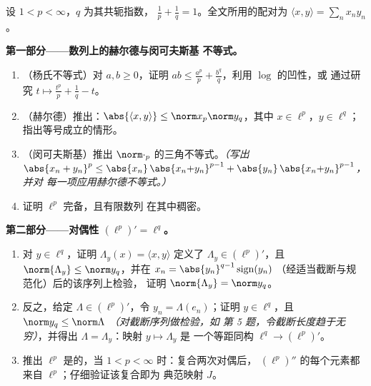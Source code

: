 \begin{problem}[{周末问题——$(\ell^p)' = \ell^q$，
自反性，以及 $\ell^\infty$ 的奇异性}]
\label{pb:b3:banach:1}
设 $1 < p < \infty$，$q$ 为其共轭指数，
$\frac1p + \frac1q = 1$。全文所用的配对为 $\langle x,
y\rangle = \sum_n x_ny_n$。

\medskip
\noindent\textbf{第一部分——数列上的赫尔德与闵可夫斯基
不等式。}
\begin{enumerate}
  \item （杨氏不等式）对 $a, b \geq 0$，证明 $ab \leq
        \frac{a^p}p + \frac{b^q}q$，利用 $\log$ 的凹性，或
        通过研究 $t \mapsto \frac{t^p}p + \frac1q - t$。
  \item （赫尔德）推出：$\abs{\langle x, y\rangle} \leq
        \norm x_p\norm y_q$，其中 $x \in \ell^p$，$y \in \ell^q$；
        指出等号成立的情形。
  \item （闵可夫斯基）推出
        $\norm\cdot_p$ 的三角不等式。\emph{（写出 $\abs{x_n + y_n}^p \leq
        \abs{x_n}\,\abs{x_n{+}y_n}^{p-1} +
        \abs{y_n}\,\abs{x_n{+}y_n}^{p-1}$，并对
        每一项应用赫尔德不等式。）}
  \item 证明 $\ell^p$ 完备，且有限数列
        在其中稠密。
\end{enumerate}

\medskip
\noindent\textbf{第二部分——对偶性 $(\ell^p)' =
\ell^q$。}
\begin{enumerate}[resume]
  \item 对 $y \in \ell^q$，证明 $\Lambda_y(x) = \langle
        x, y\rangle$ 定义了 $\Lambda_y \in (\ell^p)'$，且
        $\norm{\Lambda_y} \leq \norm y_q$，并在
        $x_n = \abs{y_n}^{q-1}\operatorname{sign}(y_n)$
        （经适当截断与规范化）后的该序列上检验，
        证明 $\norm{\Lambda_y} = \norm y_q$。
  \item 反之，给定 $\Lambda \in (\ell^p)'$，令 $y_n =
        \Lambda(e_n)$；证明 $y \in \ell^q$，且 $\norm y_q \leq
        \norm\Lambda$ \emph{（对截断序列做检验，如
        第 5 题，令截断长度趋于无穷）}，并得出
        $\Lambda = \Lambda_y$：映射 $y \mapsto \Lambda_y$ 是
        一个等距同构 $\ell^q \to (\ell^p)'$。
  \item 推出 $\ell^p$ 是\emph{}的，当 $1 < p <
        \infty$ 时：复合两次对偶后，
        $(\ell^p)''$ 的每个元素都来自 $\ell^p$；仔细验证该复合即为
        典范映射 $J$。
\end{enumerate}


\end{problem}
